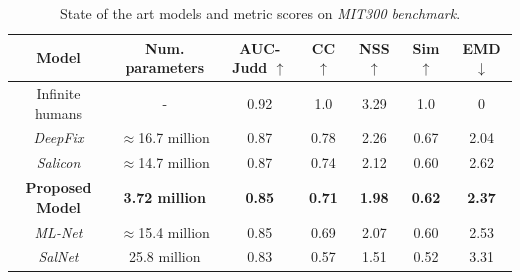 \documentclass[12pt]{article}
\begin{document}
\begin{table}[!htb]
	\small
    \centering
    \label{table:results}
    \caption{State of the art models and metric scores on
    \emph{MIT300 benchmark}.}
    \begin{tabular}{|c|c|c|c|c|c|c|}
        \hline
        Model & Num. parameters & AUC-Judd $\uparrow$ & CC $\uparrow$
            & NSS $\uparrow$ & Sim $\uparrow$ & EMD $\downarrow$\\
        \hline
        Infinite humans & - & 0.92 & 1.0 & 3.29 & 1.0 & 0\\
        \hline
        \emph{DeepFix} & $\approx$16.7 million & 0.87 & 0.78
            & 2.26 & 0.67 & 2.04\\
        \hline
        \emph{Salicon} & $\approx$14.7 million & 0.87 & 0.74 & 2.12
            & 0.60 & 2.62\\
        \hline
        \textbf{Proposed Model} & \textbf{3.72 million} & \textbf{0.85} &
        \textbf{0.71} & \textbf{1.98} & \textbf{0.62} & \textbf{2.37}\\
        \hline
        \emph{ML-Net} & $\approx$15.4 million & 0.85 & 0.69 & 2.07 & 0.60
            & 2.53\\
        \hline
        \emph{SalNet} & 25.8 million & 0.83 & 0.57 & 1.51 & 0.52 & 3.31\\
        \hline
    \end{tabular}
\end{table}



\end{document}
